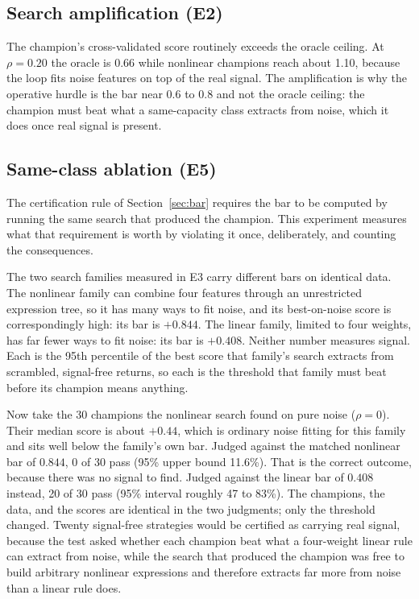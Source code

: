 \documentclass[11pt]{article}
\begin{document}
\subsection{Search amplification (E2)}
\label{sec:e2}

The champion's cross-validated score routinely exceeds the oracle ceiling. At $\rho=0.20$ the oracle
is 0.66 while nonlinear champions reach about 1.10, because the loop fits noise features on top of the
real signal. The amplification is why the operative hurdle is the bar near 0.6 to 0.8 and not the
oracle ceiling: the champion must beat what a same-capacity class extracts from noise, which it does
once real signal is present.

\subsection{Same-class ablation (E5)}
\label{sec:ablation}

The certification rule of Section~\ref{sec:bar} requires the bar to be computed by running the same
search that produced the champion. This experiment measures what that requirement is worth by violating
it once, deliberately, and counting the consequences.

The two search families measured in E3 carry different bars on identical data. The nonlinear family can
combine four features through an unrestricted expression tree, so it has many ways to fit noise, and its
best-on-noise score is correspondingly high: its bar is $+0.844$. The linear family, limited to four
weights, has far fewer ways to fit noise: its bar is $+0.408$. Neither number measures signal. Each is
the 95th percentile of the best score that family's search extracts from scrambled, signal-free returns,
so each is the threshold that family must beat before its champion means anything.

Now take the 30 champions the nonlinear search found on pure noise ($\rho=0$). Their median score is
about $+0.44$, which is ordinary noise fitting for this family and sits well below the family's own bar.
Judged against the matched nonlinear bar of $0.844$, 0 of 30 pass (95\% upper bound 11.6\%). That is the
correct outcome, because there was no signal to find. Judged against the linear bar of $0.408$ instead,
20 of 30 pass (95\% interval roughly 47 to 83\%). The champions, the data, and the scores are identical
in the two judgments; only the threshold changed. Twenty signal-free strategies would be certified as
carrying real signal, because the test asked whether each champion beat what a four-weight linear rule
can extract from noise, while the search that produced the champion was free to build arbitrary
nonlinear expressions and therefore extracts far more from noise than a linear rule does.
\end{document}
